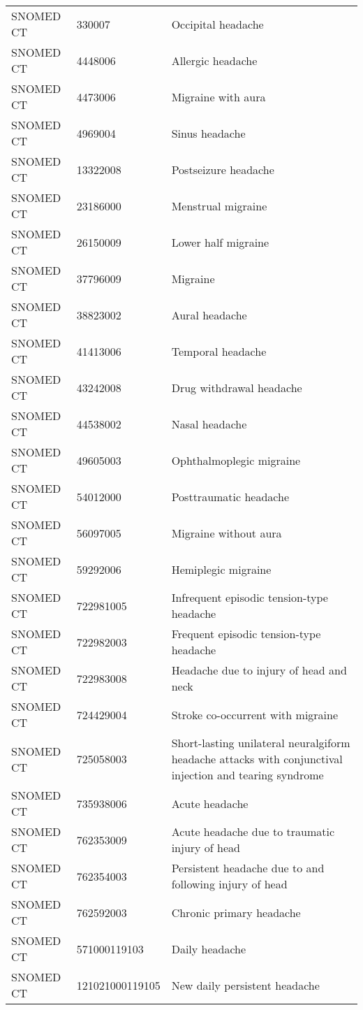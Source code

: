 \begin{longtable}{p{}p{}p{}}
  SNOMED CT & 330007 & Occipital headache \\ 
  SNOMED CT & 4448006 & Allergic headache \\ 
  SNOMED CT & 4473006 & Migraine with aura \\ 
  SNOMED CT & 4969004 & Sinus headache \\ 
  SNOMED CT & 13322008 & Postseizure headache \\ 
  SNOMED CT & 23186000 & Menstrual migraine \\ 
  SNOMED CT & 26150009 & Lower half migraine \\ 
  SNOMED CT & 37796009 & Migraine \\ 
  SNOMED CT & 38823002 & Aural headache \\ 
  SNOMED CT & 41413006 & Temporal headache \\ 
  SNOMED CT & 43242008 & Drug withdrawal headache \\ 
  SNOMED CT & 44538002 & Nasal headache \\ 
  SNOMED CT & 49605003 & Ophthalmoplegic migraine \\ 
  SNOMED CT & 54012000 & Posttraumatic headache \\ 
  SNOMED CT & 56097005 & Migraine without aura \\ 
  SNOMED CT & 59292006 & Hemiplegic migraine \\ 
  SNOMED CT & 722981005 & Infrequent episodic tension-type headache \\ 
  SNOMED CT & 722982003 & Frequent episodic tension-type headache \\ 
  SNOMED CT & 722983008 & Headache due to injury of head and neck \\ 
  SNOMED CT & 724429004 & Stroke co-occurrent with migraine \\ 
  SNOMED CT & 725058003 & Short-lasting unilateral neuralgiform headache attacks with conjunctival injection and tearing syndrome \\ 
  SNOMED CT & 735938006 & Acute headache \\ 
  SNOMED CT & 762353009 & Acute headache due to traumatic injury of head \\ 
  SNOMED CT & 762354003 & Persistent headache due to and following injury of head \\ 
  SNOMED CT & 762592003 & Chronic primary headache \\ 
  SNOMED CT & 571000119103 & Daily headache \\ 
  SNOMED CT & 121021000119105 & New daily persistent headache \\ 

\end{longtable}
